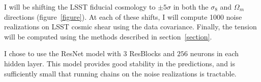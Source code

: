 I will be shifting the LSST fiducial cosmology to $\pm5\sigma$ in both the $\sigma_8$ and $\Omega_m$ directions (figure~\ref{figure}). At each of these shifts, I will compute 1000 noise realizations on LSST cosmic shear using the data covariance. Finally, the tension will be computed using the methods described in section~\ref{section}.

I chose to use the ResNet model with 3 ResBlocks and $256$ neurons in each hidden layer. This model provides good stability in the predictions, and is sufficiently small that running chains on the noise realizations is tractable.









